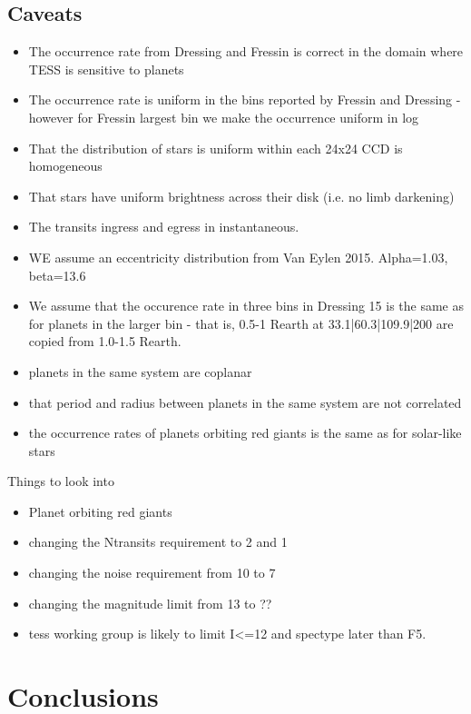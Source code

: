 \documentclass[iop,apj]{emulateapj}
\begin{document}
\subsection{Caveats}\label{sec:caveats}
\begin{itemize}
\item The occurrence rate from Dressing and Fressin is correct in the domain where TESS is sensitive to planets
\item The occurrence rate is uniform in the bins reported by Fressin and Dressing - however for Fressin largest bin we make the occurrence uniform in log
\item That the distribution of stars is uniform within each 24x24 CCD is homogeneous
\item That stars have uniform brightness across their disk (i.e. no limb darkening)
\item The transits ingress and egress in instantaneous.
\item WE assume an eccentricity distribution from Van Eylen 2015. Alpha=1.03, beta=13.6
\item We assume that the occurence rate in three bins in Dressing 15 is the same as for planets in the larger bin - that is, 0.5-1 Rearth at 33.1|60.3|109.9|200 are copied from 1.0-1.5 Rearth.
\item planets in the same system are coplanar
\item that period and radius between planets in the same system are not correlated
\item the occurrence rates of planets orbiting red giants is the same as for solar-like stars
\end{itemize}


Things to look into
\begin{itemize}
\item Planet orbiting red giants
\item changing the Ntransits requirement to 2 and 1
\item changing the noise requirement from 10 to 7
\item changing the magnitude limit from 13 to ??
\item tess working group is likely to limit I<=12 and spectype later than F5.
\end{itemize}

\section{Conclusions}



\end{document}
